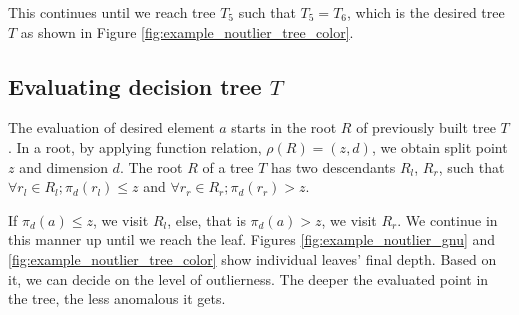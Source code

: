 \begin{example}
\begin{enumerate}
This continues until we reach tree $T_5$ such that $T_5=T_6$, which is the desired tree $T$ as shown in Figure \ref{fig:example_noutlier_tree_color}. 

\end{enumerate}

\end{example}


\subsection{Evaluating decision tree $T$}
The evaluation of desired element $a$ starts in the root $R$ of previously built tree $T$.
In a root, by applying function relation, $\rho(R) = (z,d)$, we obtain split point $z$ and dimension $d$.
The root $R$ of a tree $T$ has two descendants $R_l$, $R_r$, such that
$\forall r_l\in R_l; \pi_d(r_l) \le z$ and $\forall r_r\in R_r; \pi_d(r_r)  > z$.

If $\pi_d(a)\le z$, we visit $R_l$, else, that is $\pi_d(a) > z$, we visit $R_r$.
We continue in this manner up until we reach the leaf. Figures \ref{fig:example_noutlier_gnu} and \ref{fig:example_noutlier_tree_color} show individual leaves' final depth. Based on it, we can decide on the level of outlierness. The deeper the evaluated point in the tree, the less anomalous it gets.

